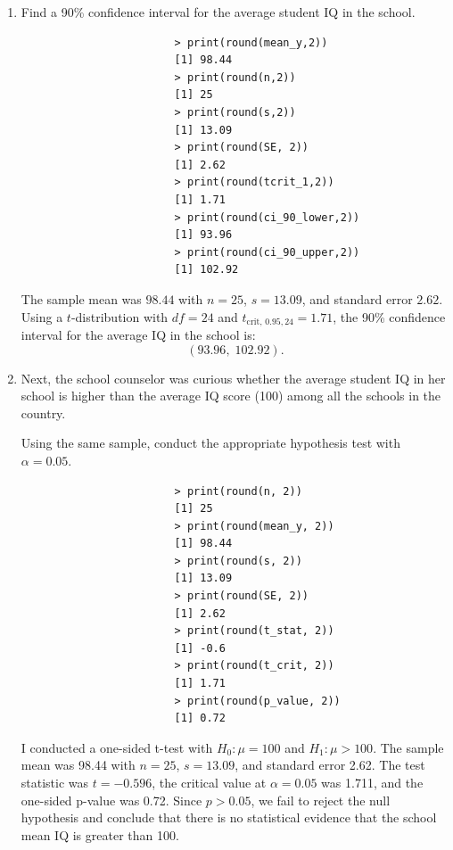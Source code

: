 \documentclass[12pt,letterpaper]{article}
\begin{document}
				\begin{enumerate}
					\item Find a 90\% confidence interval for the average student IQ in the school.
					
					
					
					\vspace{.25cm}
					
					  \begin{verbatim}
						> print(round(mean_y,2))
						[1] 98.44
						> print(round(n,2))
						[1] 25
						> print(round(s,2))
						[1] 13.09
						> print(round(SE, 2))
						[1] 2.62
						> print(round(tcrit_1,2))
						[1] 1.71
						> print(round(ci_90_lower,2))
						[1] 93.96
						> print(round(ci_90_upper,2))
						[1] 102.92
					\end{verbatim}
					
					 \vspace{.25cm}
					   \noindent The sample mean was $98.44$ with $n=25$, $s=13.09$, and standard error $2.62$.
					Using a $t$-distribution with $df = 24$ and $t_{\text{crit, }0.95,24} = 1.71$, 
					the 90\% confidence interval for the average IQ in the school is:
					\[
					(93.96,\; 102.92).
					\]
				
					\item Next, the school counselor was curious  whether  the average student IQ in her school is higher than the average IQ score (100) among all the schools in the country.
					
					\noindent Using the same sample, conduct the appropriate hypothesis test with $\alpha=0.05$.
					
					
					
						\begin{verbatim}
						> print(round(n, 2))
						[1] 25
						> print(round(mean_y, 2))
						[1] 98.44
						> print(round(s, 2))
						[1] 13.09
						> print(round(SE, 2))
						[1] 2.62
						> print(round(t_stat, 2))
						[1] -0.6
						> print(round(t_crit, 2))
						[1] 1.71
						> print(round(p_value, 2))
						[1] 0.72
						\end{verbatim}
				
					\noindent I conducted a one-sided t-test with $H_0:\mu=100$ and $H_1:\mu>100$. The sample mean was 98.44 with $n=25$, $s=13.09$, and standard error 2.62. The test statistic was $t=-0.596$, the critical value at $\alpha=0.05$ was 1.711, and the one-sided p-value was 0.72. Since $p > 0.05$, we fail to reject the null hypothesis and conclude that there is no statistical evidence that the school mean IQ is greater than 100.
					

\end{enumerate}
\end{document}
